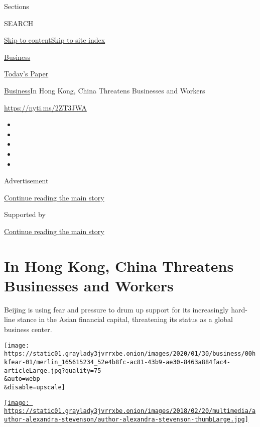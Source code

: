 Sections

SEARCH

\protect\hyperlink{site-content}{Skip to
content}\protect\hyperlink{site-index}{Skip to site index}

\href{https://www.nytimes3xbfgragh.onion/section/business}{Business}

\href{https://myaccount.nytimes3xbfgragh.onion/auth/login?response_type=cookie\&client_id=vi}{}

\href{https://www.nytimes3xbfgragh.onion/section/todayspaper}{Today's
Paper}

\href{/section/business}{Business}\textbar{}In Hong Kong, China
Threatens Businesses and Workers

\url{https://nyti.ms/2ZT3JWA}

\begin{itemize}
\item
\item
\item
\item
\item
\end{itemize}

Advertisement

\protect\hyperlink{after-top}{Continue reading the main story}

Supported by

\protect\hyperlink{after-sponsor}{Continue reading the main story}

\hypertarget{in-hong-kong-china-threatens-businesses-and-workers}{%
\section{In Hong Kong, China Threatens Businesses and
Workers}\label{in-hong-kong-china-threatens-businesses-and-workers}}

Beijing is using fear and pressure to drum up support for its
increasingly hard-line stance in the Asian financial capital,
threatening its status as a global business center.

\texttt{[image: https://static01.graylady3jvrrxbe.onion/images/2020/01/30/business/00hkfear-01/merlin\_165615234\_52e4b8fc-ac81-43b9-ae30-8463a884fac4-articleLarge.jpg?quality=75\\\&auto=webp\\\&disable=upscale]}

\href{https://www.nytimes3xbfgragh.onion/by/alexandra-stevenson}{\texttt{[image: https://static01.graylady3jvrrxbe.onion/images/2018/02/20/multimedia/author-alexandra-stevenson/author-alexandra-stevenson-thumbLarge.jpg]}}

